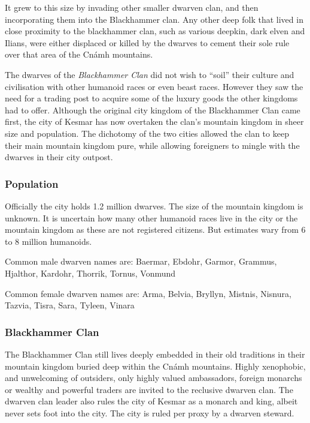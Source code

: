 It grew to this size by invading other smaller dwarven clan, and then
incorporating them into the Blackhammer clan. Any other deep folk that lived
in close proximity to the blackhammer clan, such as various deepkin, dark
elven and Ilians, were either displaced or killed by the dwarves to cement
their sole rule over that area of the Cnámh mountains.

The dwarves of the \emph{Blackhammer Clan} did not wish to ``soil'' their
culture and civilisation with other humanoid races or even beast
races. However they saw the need for a trading post to acquire some of the
luxury goods the other kingdoms had to offer. Although the original city
kingdom of the Blackhammer Clan came first, the city of Kesmar has now
overtaken the clan's mountain kingdom in sheer size and population. The
dichotomy of the two cities allowed the clan to keep their main mountain
kingdom pure, while allowing foreigners to mingle with the dwarves in their
city outpost.

\subsubsection{Population}

Officially the city holds 1.2 million dwarves. The size of the mountain
kingdom is unknown. It is uncertain how many other humanoid races live in
the city or the mountain kingdom as these are not registered citizens. But
estimates wary from 6 to 8 million humanoids.

Common male dwarven names are: Baermar, Ebdohr, Garmor, Grammus, Hjalthor,
Kardohr, Thorrik, Tornus, Vonmund

Common female dwarven names are: Arma, Belvia, Bryllyn, Mistnis, Nisnura, Tazvia,
Tisra, Sara, Tyleen, Vinara

\subsubsection{Blackhammer Clan}
\label{sec:Blackhammer Clan}

The Blackhammer Clan still lives deeply embedded in their old traditions in
their mountain kingdom buried deep within the Cnámh mountains. Highly
xenophobic, and unwelcoming of outsiders, only highly valued ambassadors,
foreign monarchs or wealthy and powerful traders are invited to the reclusive
dwarven clan. The dwarven clan leader also rules the city of Kesmar as a
monarch and king, albeit never sets foot into the city. The city is ruled per
proxy by a dwarven steward.

